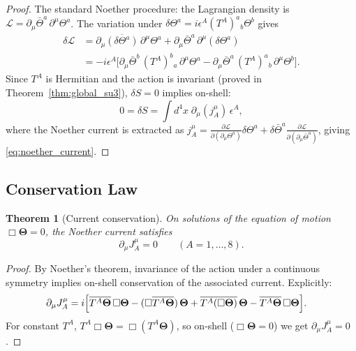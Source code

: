 \documentclass[12pt,a4paper]{article}
\newtheorem{theorem}{Theorem}[section]
\theoremstyle{remark}
\begin{document}
\begin{proof}
  The standard Noether procedure: the Lagrangian density is
  $\mathcal{L} = \partial_\mu\bar\Theta^a\,\partial^\mu\Theta^a$.
  The variation under $\delta\Theta^a = i\epsilon^A(T^A)^a{}_b\Theta^b$ gives
  \begin{align}
    \delta\mathcal{L}
    &= \partial_\mu\overline{(\delta\Theta^a)}\,\partial^\mu\Theta^a
      + \partial_\mu\bar\Theta^a\,\partial^\mu(\delta\Theta^a)
    \nonumber\\
    &= -i\epsilon^A
      \bigl[
        \partial_\mu\bar\Theta^b\,(T^A)^b{}_a\,\partial^\mu\Theta^a
        - \partial_\mu\bar\Theta^a\,(T^A)^a{}_b\,\partial^\mu\Theta^b
      \bigr].
  \end{align}
  Since $T^A$ is Hermitian and the action is invariant (proved in
  Theorem~\ref{thm:global_su3}), $\delta S=0$ implies on-shell:
  \begin{equation}
    0 = \delta S = \int d^4x\;\partial_\mu(j^\mu_A)\,\epsilon^A,
  \end{equation}
  where the Noether current is extracted as
  $j^\mu_A = \frac{\partial\mathcal{L}}{\partial(\partial_\mu\Theta^a)}\delta\Theta^a
  + \delta\bar\Theta^a\frac{\partial\mathcal{L}}{\partial(\partial_\mu\bar\Theta^a)}$,
  giving \eqref{eq:noether_current}.
\end{proof}

\subsection{Conservation Law}

\begin{theorem}[Current conservation]
  \label{thm:current_conservation}
  On solutions of the equation of motion $\Box\boldsymbol{\Theta}=0$, the
  Noether current satisfies
  \begin{equation}
    \label{eq:current_conservation}
    \partial_\mu J_A^\mu = 0
    \qquad (A=1,\ldots,8).
  \end{equation}
\end{theorem}

\begin{proof}
  By Noether's theorem, invariance of the action under a continuous symmetry
  implies on-shell conservation of the associated current.  Explicitly:
  \begin{align}
    \partial_\mu J_A^\mu
    &= i\Bigl[
        \overline{T^A\boldsymbol{\Theta}}\,\Box\boldsymbol{\Theta}
        - (\Box\overline{T^A\boldsymbol{\Theta}})\,\boldsymbol{\Theta}
        + \overline{T^A(\Box\boldsymbol{\Theta})}\,\boldsymbol{\Theta}
        - \overline{T^A\boldsymbol{\Theta}}\,\Box\boldsymbol{\Theta}
      \Bigr].
  \end{align}
  For constant $T^A$, $T^A\Box\boldsymbol{\Theta} = \Box(T^A\boldsymbol{\Theta})$,
  so on-shell ($\Box\boldsymbol{\Theta}=0$) we get $\partial_\mu J_A^\mu=0$.
\end{proof}
\end{document}
